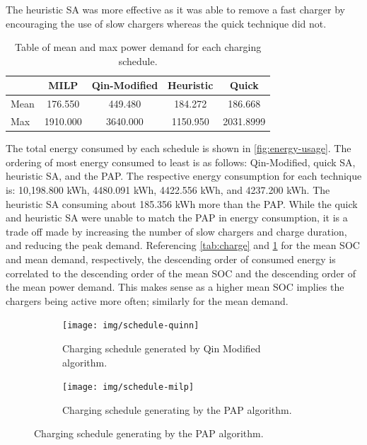 \documentclass[energies,article,submit,moreauthors]{Definitions/mdpi}
\begin{document}
The heuristic SA was more effective as it was able to remove a fast charger by encouraging the
use of slow chargers whereas the quick technique did not.

\begin{table}[htbp]
\caption{\label{tab:power}Table of mean and max power demand for each charging schedule.}
\centering
\begin{tabular}{l|cccc}
\hline
 & MILP & Qin-Modified & Heuristic & Quick\\[0pt]
\hline
Mean & 176.550 & 449.480 & 184.272 & 186.668\\[0pt]
Max & 1910.000 & 3640.000 & 1150.950 & 2031.8999\\[0pt]
\hline
\end{tabular}
\end{table}

The total energy consumed by each schedule is shown in \ref{fig:energy-usage}. The ordering of most energy consumed to
least is as follows: Qin-Modified, quick SA, heuristic SA, and the PAP. The respective energy consumption for each
technique is: 10,198.800 kWh, 4480.091 kWh, 4422.556 kWh, and 4237.200 kWh. The heuristic SA consuming about 185.356 kWh
more than the PAP. While the quick and heuristic SA were unable to match the PAP in energy consumption, it is a trade
off made by increasing the number of slow chargers and charge duration, and reducing the peak demand. Referencing
\ref{tab:charge} and \ref{tab:power} for the mean SOC and mean demand, respectively, the descending order of consumed
energy is correlated to the descending order of the mean SOC and the descending order of the mean power demand. This
makes sense as a higher mean SOC implies the chargers being active more often; similarly for the mean demand.

\begin{figure}
  \centering
  \begin{subfigure}[t]{\textwidth}
    \centering
    \texttt{[image: img/schedule-quinn]}
    \caption{Charging schedule generated by Qin Modified algorithm.}
    \label{subfig:schedule-qin}
  \end{subfigure}

  \hfill

  \begin{subfigure}[t]{\textwidth}
    \centering
    \texttt{[image: img/schedule-milp]}
    \caption{Charging schedule generating by the PAP algorithm.}
    \label{subfig:schedule-milp}
  \end{subfigure}
\end{figure}
\end{document}

